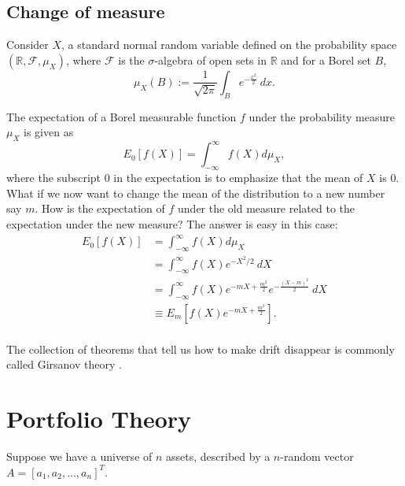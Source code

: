 \documentclass{amsart}
\theoremstyle{plain}
\numberwithin{equation}{section}
\begin{document}
\subsection*{Change of measure}
Consider $X$, a standard normal 
random variable defined on the 
probability space $(\mathbb{R}, \mathcal{F}, \mu_X)$, where
$\mathcal{F}$ is the $\sigma$-algebra 
of open sets in $\mathbb{R}$ and
for a Borel set $B$,
\begin{equation*}
\mu_X(B) := \frac{1}{\sqrt{2 \pi} }
\int_{B} e^{-\frac{x^2}{2}} \: dx.
\end{equation*}

The expectation of a Borel measurable function 
$f$ under the probability measure 
$\mu_X$ is given as
\begin{equation*}
E_0[f(X)] = \int_{-\infty}^{\infty} f(X) d\mu_X,
\end{equation*}
where the subscript $0$ in the expectation is to 
emphasize that the mean of $X$ is $0$. What if
we now want to change the mean of the distribution
to a new number say $m$. How is the expectation of
$f$ under the old measure related to the 
expectation under the new measure?
The answer is easy in this case:
\begin{align*}
E_0[f(X)] &= \int_{-\infty}^{\infty} f(X) d\mu_X \\
					&= \int_{-\infty}^{\infty} f(X) e^{-X^2/2} \: dX \\
					&= \int_{-\infty}^{\infty} f(X) e^{-mX + \frac{m^2}{2}}e^{-\frac{(X-m)^2}{2}} \: dX \\
					&\equiv E_m\left[f(X)e^{-mX + \frac{m^2}{2}}\right].\\
\end{align*}


The collection of theorems that tell us how to make 
drift disappear is commonly called Girsanov theory
\cite[Ch.\ 13]{steele2001stochastic}.

\section{Portfolio Theory}
Suppose we have a universe of 
$n$ assets, described by a $n$-random vector 
$A =[a_1, a_2, \ldots, a_n]^T$.
\end{document}
